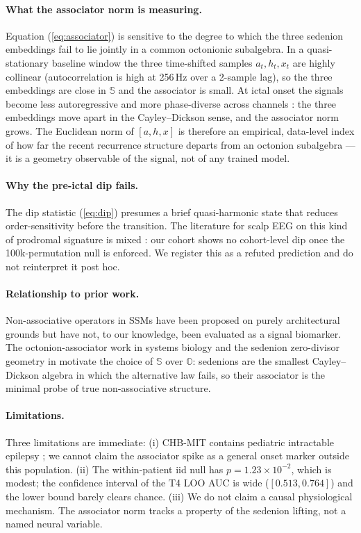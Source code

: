 \documentclass[11pt,twocolumn]{article}
\begin{document}
\paragraph{What the associator norm is measuring.}
Equation (\ref{eq:associator}) is sensitive to the degree to
which the three sedenion embeddings fail to lie jointly in a
common octonionic subalgebra. In a quasi-stationary baseline
window the three time-shifted samples $a_t, h_t, x_t$ are highly
collinear (autocorrelation is high at 256\,Hz over a 2-sample lag),
so the three embeddings are close in $\mathbb{S}$ and the
associator is small. At ictal onset the signals become less
autoregressive and more phase-diverse across channels
\cite{jirsa2014nature,schindler2007}: the three embeddings move
apart in the Cayley--Dickson sense, and the associator norm grows.
The Euclidean norm of $[a,h,x]$ is therefore an empirical,
data-level index of how far the recent recurrence structure
departs from an octonion subalgebra --- it is a geometry observable
of the signal, not of any trained model.

\paragraph{Why the pre-ictal dip fails.}
The dip statistic (\ref{eq:dip}) presumes a brief
quasi-harmonic state that reduces order-sensitivity before
the transition. The literature for scalp EEG on this kind of
prodromal signature is mixed \cite{mormann2007seizure,litt2001}:
our cohort shows no cohort-level dip once the 100k-permutation
null is enforced. We register this as a refuted prediction and do
not reinterpret it post hoc.

\paragraph{Relationship to prior work.}
Non-associative operators in SSMs have been proposed on purely
architectural grounds \cite{gu2022efficiently} but have not, to
our knowledge, been evaluated as a signal biomarker. The
octonion-associator work in systems biology
\cite{agourakis2026fano} and the sedenion zero-divisor geometry
in \cite{cawagas2004,kinyon2004zero} motivate the choice of
$\mathbb{S}$ over $\mathbb{O}$: sedenions are the smallest
Cayley--Dickson algebra in which the alternative law fails, so
their associator is the minimal probe of true non-associative
structure.

\paragraph{Limitations.}
Three limitations are immediate:
(i) CHB-MIT contains pediatric intractable epilepsy
    \cite{shoeb2009}; we cannot claim the associator spike as a
    general onset marker outside this population.
(ii) The within-patient iid null has $p=1.23\times10^{-2}$, which
     is modest; the confidence interval of the T4 LOO AUC is wide
     ($[0.513,0.764]$) and the lower bound barely clears chance.
(iii) We do not claim a causal physiological mechanism. The
      associator norm tracks a property of the sedenion lifting,
      not a named neural variable.
\end{document}

